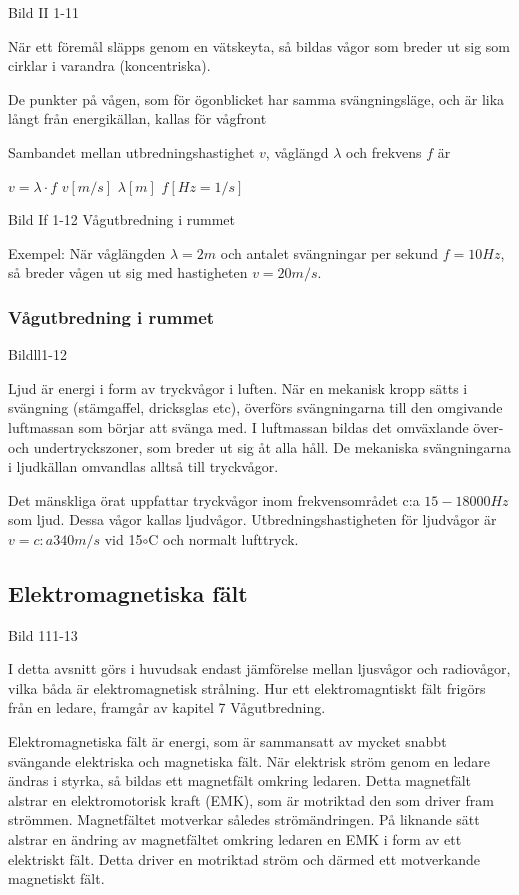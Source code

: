 Bild II 1-11

När ett föremål släpps genom en vätskeyta, så bildas vågor som breder ut sig som cirklar
i varandra (koncentriska).

De punkter på vågen, som för ögonblicket har samma svängningsläge, och är lika långt från
energikällan, kallas för vågfront

Sambandet mellan utbredningshastighet \(v\), våglängd \(\lambda\) och frekvens \(f\) är

\(v = \lambda \cdot f\) \(v [m/s]\) \(\lambda [m]\) \(f [Hz=1/s]\)

Bild If 1-12 Vågutbredning i rummet

Exempel: När våglängden \(\lambda = 2 m\) och antalet svängningar per sekund \(f = 10 Hz\),
så breder vågen ut sig med hastigheten \(v = 20 m/s\).

\subsubsection{Vågutbredning i rummet}

Bildll1-12

Ljud är energi i form av tryckvågor i luften. När en mekanisk kropp sätts i svängning
(stämgaffel, dricksglas etc), överförs svängningarna till den omgivande luftmassan som
börjar att svänga med. I luftmassan bildas det omväxlande över- och undertryckszoner, som
breder ut sig åt alla håll. De mekaniska svängningarna i ljudkällan omvandlas alltså till
tryckvågor.

Det mänskliga örat uppfattar tryckvågor inom frekvensområdet c:a \(15-18000 Hz\) som ljud.
Dessa vågor kallas ljudvågor. Utbredningshastigheten för ljudvågor är \(v = c:a 340 m/s\) vid 
15\(\circ\)C och normalt lufttryck.

\subsection{Elektromagnetiska fält}

Bild 111-13

I detta avsnitt görs i huvudsak endast jämförelse mellan ljusvågor och radiovågor, vilka
båda är elektromagnetisk strålning. Hur ett elektromagntiskt fält frigörs från en ledare,
framgår av kapitel 7 Vågutbredning.

Elektromagnetiska fält är energi, som är sammansatt av mycket snabbt svängande elektriska
och magnetiska fält. När elektrisk ström genom en ledare ändras i styrka, så bildas ett
magnetfält omkring ledaren. Detta magnetfält alstrar en elektromotorisk kraft (EMK), som
är motriktad den som driver fram strömmen. Magnetfältet motverkar således strömändringen.
På liknande sätt alstrar en ändring av magnetfältet omkring ledaren en EMK i form av ett
elektriskt fält. Detta driver en motriktad ström och därmed ett motverkande magnetiskt
fält.


